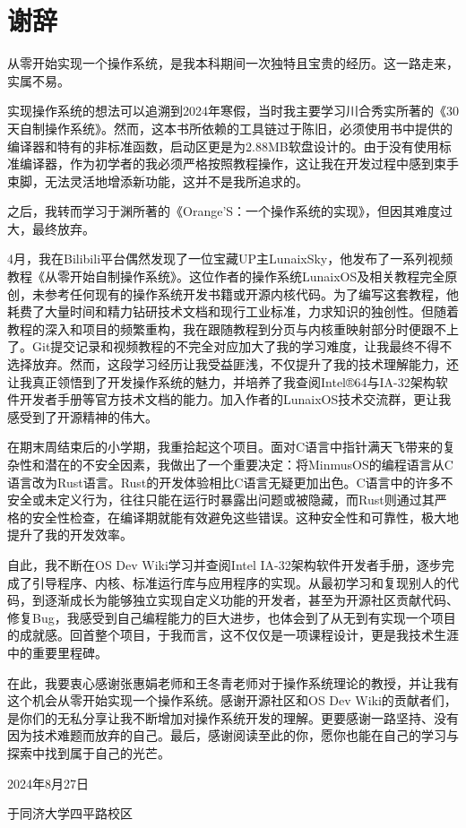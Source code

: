 \section*{谢辞}

从零开始实现一个操作系统，是我本科期间一次独特且宝贵的经历。这一路走来，实属不易。

实现操作系统的想法可以追溯到2024年寒假，当时我主要学习川合秀实所著的《30天自制操作系统》。然而，这本书所依赖的工具链过于陈旧，必须使用书中提供的编译器和特有的非标准函数，启动区更是为2.88MB软盘设计的。由于没有使用标准编译器，作为初学者的我必须严格按照教程操作，这让我在开发过程中感到束手束脚，无法灵活地增添新功能，这并不是我所追求的。

之后，我转而学习于渊所著的《Orange'S：一个操作系统的实现》，但因其难度过大，最终放弃。

4月，我在Bilibili平台偶然发现了一位宝藏UP主LunaixSky，他发布了一系列视频教程《从零开始自制操作系统》。这位作者的操作系统LunaixOS及相关教程完全原创，未参考任何现有的操作系统开发书籍或开源内核代码。为了编写这套教程，他耗费了大量时间和精力钻研技术文档和现行工业标准，力求知识的独创性。但随着教程的深入和项目的频繁重构，我在跟随教程到分页与内核重映射部分时便跟不上了。Git提交记录和视频教程的不完全对应加大了我的学习难度，让我最终不得不选择放弃。然而，这段学习经历让我受益匪浅，不仅提升了我的技术理解能力，还让我真正领悟到了开发操作系统的魅力，并培养了我查阅Intel®64与IA-32架构软件开发者手册等官方技术文档的能力。加入作者的LunaixOS技术交流群，更让我感受到了开源精神的伟大。

在期末周结束后的小学期，我重拾起这个项目。面对C语言中指针满天飞带来的复杂性和潜在的不安全因素，我做出了一个重要决定：将MinmusOS的编程语言从C语言改为Rust语言。Rust的开发体验相比C语言无疑更加出色。C语言中的许多不安全或未定义行为，往往只能在运行时暴露出问题或被隐藏，而Rust则通过其严格的安全性检查，在编译期就能有效避免这些错误。这种安全性和可靠性，极大地提升了我的开发效率。

自此，我不断在OS Dev Wiki学习并查阅Intel IA-32架构软件开发者手册，逐步完成了引导程序、内核、标准运行库与应用程序的实现。从最初学习和复现别人的代码，到逐渐成长为能够独立实现自定义功能的开发者，甚至为开源社区贡献代码、修复Bug，我感受到自己编程能力的巨大进步，也体会到了从无到有实现一个项目的成就感。回首整个项目，于我而言，这不仅仅是一项课程设计，更是我技术生涯中的重要里程碑。

在此，我要衷心感谢张惠娟老师和王冬青老师对于操作系统理论的教授，并让我有这个机会从零开始实现一个操作系统。感谢开源社区和OS Dev Wiki的贡献者们，是你们的无私分享让我不断增加对操作系统开发的理解。更要感谢一路坚持、没有因为技术难题而放弃的自己。最后，感谢阅读至此的你，愿你也能在自己的学习与探索中找到属于自己的光芒。

\hfill 2024年8月27日

\hfill 于同济大学四平路校区